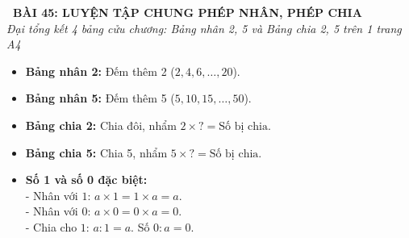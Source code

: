 \documentclass[11pt,a4paper]{article}
\begin{document}
\begin{tcolorbox}[
  enhanced,
  colback=violet!8!white,
  colframe=violet!70!black,
  arc=3mm, boxrule=1.2pt,
  left=3mm, right=3mm, top=2mm, bottom=2mm,
  halign=center
]
  {\LARGE\bfseries\color{violet!90!black}\faBookmark\ BÀI 45: LUYỆN TẬP CHUNG PHÉP NHÂN, PHÉP CHIA}\\[1mm]
  {\itshape\footnotesize\color{black!75} Đại tổng kết 4 bảng cửu chương: Bảng nhân 2, 5 và Bảng chia 2, 5 trên 1 trang A4}
\end{tcolorbox}

\vspace{-2mm}

\noindent
\begin{minipage}[t]{0.49\textwidth}\vspace{0pt}
\begin{tcolorbox}[
  enhanced,
  colback=violet!4!white,
  colframe=violet!75!black,
  arc=2mm, boxrule=0.8pt,
  left=2mm, right=2mm, top=1.8mm, bottom=1.8mm,
  title={\footnotesize\bfseries\color{white}\faKey\ 1. Bốn bảng cửu chương nền tảng}
]
{\footnotesize
\begin{itemize}\setlength{\itemsep}{1pt}\setlength{\leftskip}{-2.5mm}
  \item \textbf{Bảng nhân 2:} Đếm thêm 2 ($2, 4, 6, \dots, 20$).
  \item \textbf{Bảng nhân 5:} Đếm thêm 5 ($5, 10, 15, \dots, 50$).
  \item \textbf{Bảng chia 2:} Chia đôi, nhẩm $2 \times ? = \text{Số bị chia}$.
  \item \textbf{Bảng chia 5:} Chia 5, nhẩm $5 \times ? = \text{Số bị chia}$.
  \item \textbf{Số 1 và số 0 đặc biệt:}\\
  - Nhân với $1$: $a \times 1 = 1 \times a = a$.\\
  - Nhân với $0$: $a \times 0 = 0 \times a = 0$.\\
  - Chia cho $1$: $a : 1 = a$. Số $0 : a = 0$.
\end{itemize}
}
\end{tcolorbox}
\end{minipage}
\hfill
\end{document}
